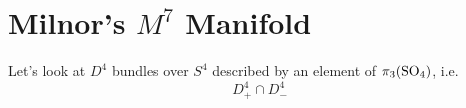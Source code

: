 \chapter{Milnor's \texorpdfstring{$M^7$}{M\^7} Manifold}

Let's look at $D^{4}$ bundles over $S^{4}$ described by an element of $\pi_3({\operatorname{SO}}_4)$, i.e. 
\[
    D^4_+\cap D^4_-
\]
